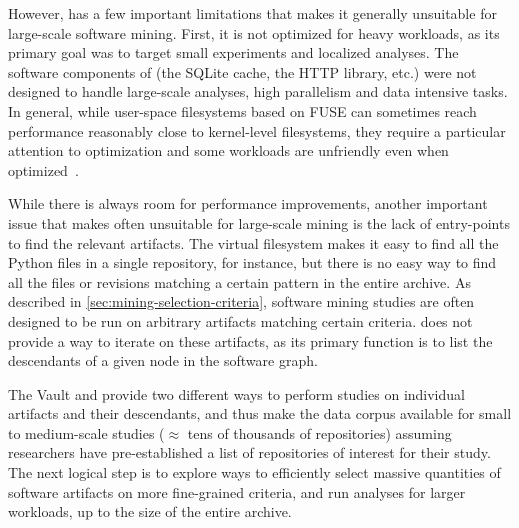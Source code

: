 However, \SWHFS{} has a few important limitations that makes it generally
unsuitable for large-scale software mining. First, it is not optimized for
heavy workloads, as its primary goal was to target small experiments and
localized analyses. The software components of \SWHFS{} (the SQLite cache, the
HTTP library, etc.) were not designed to handle large-scale analyses, high
parallelism and data intensive tasks. In general, while user-space filesystems
based on FUSE can sometimes reach performance reasonably close to kernel-level
filesystems, they require a particular attention to optimization and some
workloads are unfriendly even when optimized~\cite{vangoor2017fuseperf}.

While there is always room for performance improvements, another important
issue that makes \SWHFS{} often unsuitable for large-scale mining is the lack of
entry-points to find the relevant artifacts. The virtual filesystem makes
it easy to find all the Python files in a single repository, for instance,
but there is no easy way to find all the files or revisions matching a certain
pattern in the entire archive. As described in
\cref{sec:mining-selection-criteria}, software mining studies are often
designed to be run on arbitrary artifacts matching certain criteria. \SWHFS{}
does not provide a way to iterate on these artifacts, as its primary function
is to list the descendants of a given node in the software graph.

\bigskip

The Vault and \SWHFS{} provide two different ways to perform studies on
individual artifacts and their descendants, and thus make the data corpus
available for small to medium-scale studies ($\approx$ tens of thousands of
repositories) assuming researchers have pre-established a list of repositories
of interest for their study.
The next logical step is to explore ways to efficiently select massive
quantities of software artifacts on more fine-grained criteria, and
run analyses for larger workloads, up to the size of the entire archive.
